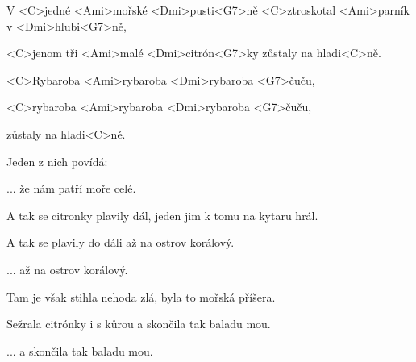 

\zs
V <C>jedné <Ami>mořské <Dmi>pusti<G7>ně
<C>ztroskotal <Ami>parník v <Dmi>hlubi<G7>ně,

<C>jenom tři <Ami>malé <Dmi>citrón<G7>ky
zůstaly na hladi<C>ně.
\ks

\zr
<C>Rybaroba <Ami>rybaroba <Dmi>rybaroba <G7>čuču,

<C>rybaroba <Ami>rybaroba <Dmi>rybaroba <G7>čuču,

zůstaly na hladi<C>ně.
\kr

\zs
Jeden z nich povídá: 
\ks

\zr ... že nám patří moře celé. \kr

\zs
A tak se citronky plavily dál, jeden jim k tomu na kytaru hrál.

A tak se plavily do dáli až na ostrov korálový.
\ks

\zr ... až na ostrov korálový. \kr

\zs
Tam je však stihla nehoda zlá, byla to mořská příšera.

Sežrala citrónky i s kůrou a skončila tak baladu mou.
\ks

\zr ... a skončila tak baladu mou. \kr

\kp
